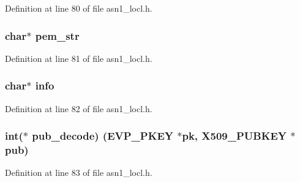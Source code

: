 Definition at line 80 of file asn1\+\_\+locl.\+h.

\subsubsection[{\texorpdfstring{pem\+\_\+str}{pem_str}}]{\setlength{\rightskip}{0pt plus 5cm}char$\ast$ pem\+\_\+str}\hypertarget{structevp__pkey__asn1__method__st_aeb0c9b2b27fe6a9b06c0927172dd7ce7}{}\label{structevp__pkey__asn1__method__st_aeb0c9b2b27fe6a9b06c0927172dd7ce7}


Definition at line 81 of file asn1\+\_\+locl.\+h.

\subsubsection[{\texorpdfstring{info}{info}}]{\setlength{\rightskip}{0pt plus 5cm}char$\ast$ info}\hypertarget{structevp__pkey__asn1__method__st_a65627378647d3a125ae55432f3f569e2}{}\label{structevp__pkey__asn1__method__st_a65627378647d3a125ae55432f3f569e2}


Definition at line 82 of file asn1\+\_\+locl.\+h.

\subsubsection[{\texorpdfstring{pub\+\_\+decode}{pub_decode}}]{\setlength{\rightskip}{0pt plus 5cm}int($\ast$ pub\+\_\+decode) ({\bf E\+V\+P\+\_\+\+P\+K\+EY} $\ast$pk, {\bf X509\+\_\+\+P\+U\+B\+K\+EY} $\ast$pub)}\hypertarget{structevp__pkey__asn1__method__st_abb9cc296e1842e3bf89fbd0c6443df91}{}\label{structevp__pkey__asn1__method__st_abb9cc296e1842e3bf89fbd0c6443df91}


Definition at line 83 of file asn1\+\_\+locl.\+h.

